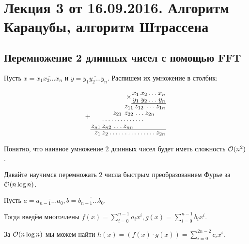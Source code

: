 \documentclass[a4paper, 12pt]{article}
\begin{document}
\pagestyle{fancy}

\section{Лекция 3 от 16.09.2016. Алгоритм Карацубы, алгоритм Штрассена}

\subsection{Перемножение 2 длинных чисел с помощью FFT}

Пусть $x = \overline{x_1 x_2 \ldots x_n}$ и $y = \overline{y_1 y_2 \ldots y_n}$. Распишем их умножение в столбик:
\begin{center}
  \[
  \renewcommand{\arraystretch}{0.8}
  \arraycolsep=1pt
  \begin{array}{r}
  \times\begin{array}{rrrr}
  x_1 & x_2 & \ldots & x_n \\
  y_1 & y_2 & \ldots & y_n \\
  \hline
  \end{array}
  \\
  +\begin{array}{rrrrrrr}
  & & & z_{11} & z_{12} & \ldots & z_{1n} \\
  & & z_{21} & z_{22} & \ldots & z_{2n} & \\
  & \hdotsfor{4} & & \\
  z_{n1} & z_{n2} & \ldots & z_{nn} & & & \\
  \hline
  \end{array}
  \\
  \begin{array}{rrrrrrrr}
  z_{1} & z_{2} & \dots & \dots & \dots & \dots & \dots & z_{2n}\\
  \end{array}
  \end{array}\]
\end{center}

Понятно, что наивное умножение 2 длинных чисел будет иметь сложность $\mathcal{O}(n^2)$.

Давайте научимся перемножать 2 числа быстрым преобразованием Фурье за $\mathcal{O}(n\log n)$.

Пусть $a = \overline{a_{n - 1}\ldots a_0}, b = \overline{b_{n - 1}\ldots b_0}$.

Тогда введём многочлены $f(x) = \sum\limits_{i = 0}^{n - 1} a_ix^i,
g(x) = \sum\limits_{i = 0}^{n - 1} b_ix^i$.

За $\mathcal{O}(n\log n)$ мы можем найти $h(x) = (f(x) \cdot g(x)) = \sum\limits_{i = 0}^{2n - 2} c_i x^i$.
\end{document}
